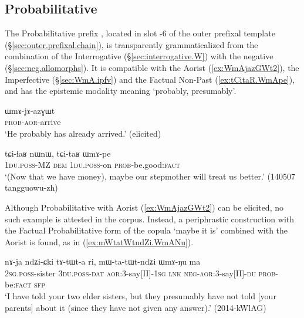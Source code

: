 \subsection{Probabilitative} \label{sec:WmA}
The Probabilitative prefix , located in slot -6 of the outer prefixal template (§\ref{sec:outer.prefixal.chain}), is transparently grammaticalized from the combination of the Interrogative  (§\ref{sec:interrogative.W}) with the negative  (§\ref{sec:neg.allomorphs}). It is compatible with the Aorist  (\ref{ex:WmAjazGWt2}), the Imperfective (§\ref{sec:WmA.ipfv}) and the Factual Non-Past (\ref{ex:tCitaR.WmApe}), and has the epistemic modality meaning `probably, presumably'.

 \begin{exe}
 \ex \label{ex:WmAjazGWt2}
\gll ɯmɤ-jɤ-azɣɯt  \\
\textsc{prob}-\textsc{aor}-arrive \\
\glt `He probably has already arrived.' (elicited)
\end{exe}

 \begin{exe}
 \ex \label{ex:tCitaR.WmApe}
\gll tɕi-ɬaʁ nɯnɯ, tɕi-taʁ ɯmɤ-pe \\
\textsc{1du}.\textsc{poss}-MZ \textsc{dem} \textsc{1du}.\textsc{poss}-on \textsc{prob}-be.good:\textsc{fact} \\
\glt `(Now that we have money), maybe our stepmother will treat us better.' (140507 tangguowu-zh) 
\end{exe}

Although Probabilitative with Aorist (\ref{ex:WmAjazGWt2}) can be elicited, no such example is attested in the corpus. Instead, a periphrastic construction with the Factual Probabilitative form of the copula  `maybe it is' combined with the Aorist is found, as in (\ref{ex:mWtatWtndZi.WmANu}).
 
 \begin{exe}
 \ex \label{ex:mWtatWtndZi.WmANu}
\gll nɤ-ja ndʑi-ɕki tɤ-tɯt-a ri, mɯ-ta-tɯt-ndʑi ɯmɤ-ŋu ma \\
\textsc{2sg}.\textsc{poss}-sister \textsc{3du}.\textsc{poss}-\textsc{dat} \textsc{aor}:3\flobv{}-say[II]-\textsc{1sg} \textsc{lnk} \textsc{neg}-\textsc{aor}:3\flobv{}-say[II]-\textsc{du} \textsc{prob}-be:\textsc{fact} \textsc{sfp} \\
\glt `I have told your two elder sisters, but they presumably have not told [your parents] about it (since they have not given any answer).' (2014-kWlAG)
\end{exe}

